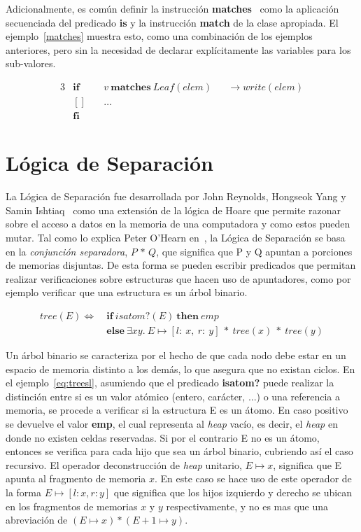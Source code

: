 Adicionalmente, es común definir la instrucción \textbf{matches}~\cite{ravelo}
como la aplicación secuenciada del predicado \textbf{is} y la instrucción
\textbf{match} de la clase apropiada. El ejemplo~\ref{matches} muestra esto,
como una combinación de los ejemplos anteriores, pero sin la necesidad de
declarar explícitamente las variables para los sub-valores.

\begin{alignat}{3}
&\boldsymbol{if}\ && v\ \boldsymbol{matches}\ Leaf(elem)         && \rightarrow write(elem) \nonumber \\
&\boldsymbol{[]}\ && \ldots                                                        \label{matches} \\
&\boldsymbol{fi} \nonumber
\end{alignat}

\section{Lógica de Separación}

La Lógica de Separación fue desarrollada por John Reynolds, Hongseok Yang y
Samin Ishtiaq~\cite{seplogpaper1,seplogpaper2,seplogpaper3} como una
extensión de la lógica de Hoare que permite razonar sobre el acceso a datos en
la memoria de una computadora y como estos pueden mutar. Tal como lo explica
Peter O'Hearn en~\cite{separation-logic}, la Lógica de Separación se basa en
la \textit{conjunción separadora}, $P\, \ast\, Q$, que significa que P y Q apuntan a
porciones de memorias disjuntas. De esta forma se pueden escribir predicados
que permitan realizar verificaciones sobre estructuras que hacen uso de
apuntadores, como por ejemplo verificar que una estructura es un árbol
binario.

\begin{align}
  tree(E) \Longleftrightarrow\ &\boldsymbol{if}\ isatom?(E)\ \boldsymbol{then}\ emp \label{eq:treesl}\\
             &\boldsymbol{else}\ \exists xy.\ E\mapsto[l:\ x,\ r:\ y]\ *\ tree(x)\ *\ tree(y) \nonumber
\end{align}

Un árbol binario se caracteriza por el hecho de que cada nodo debe estar en un
espacio de memoria distinto a los demás, lo que asegura que no existan ciclos.
En el ejemplo~\ref{eq:treesl}, asumiendo que el predicado \textbf{isatom?} puede
realizar la distinción entre si es un valor atómico (entero, carácter, ...) o
una referencia a memoria, se procede a verificar si la estructura E es un átomo.
En caso positivo se devuelve el valor \textbf{emp}, el cual representa al
\textit{heap} vacío, es decir, el \textit{heap} en donde no existen celdas
reservadas. Si por el contrario E no es un átomo, entonces se verifica para cada
hijo que sea un árbol binario, cubriendo así el caso recursivo. El operador
deconstrucción de \textit{heap} unitario, $E \mapsto x$, significa que E apunta al
fragmento de memoria $x$. En este caso se hace uso de este operador de la forma
$E\mapsto [l: x, r: y]$ que significa que los hijos izquierdo y derecho se
ubican en los fragmentos de memorias $x$ y $y$ respectivamente, y no es mas que
una abreviación de $(E\mapsto x) * (E+1\mapsto y)$.


